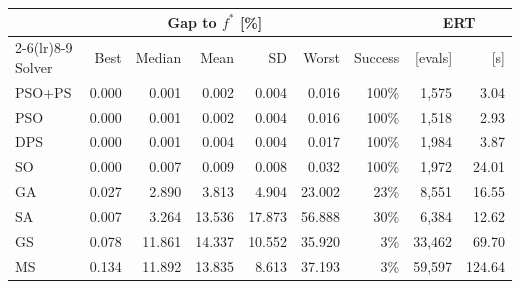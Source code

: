 \begin{tabular}{lrrrrrrrr}
\toprule
 & \multicolumn{5}{c}{Gap to $f^*$ [\%]} & & \multicolumn{2}{c}{ERT} \\
\cmidrule(lr){2-6}\cmidrule(lr){8-9}
Solver & Best & Median & Mean & SD & Worst & Success & [evals] & [s]\\
\midrule
PSO+PS & 0.000 & 0.001 & 0.002 & 0.004 & 0.016 & 100\% & 1,575 & 3.04\\
PSO & 0.000 & 0.001 & 0.002 & 0.004 & 0.016 & 100\% & 1,518 & 2.93\\
DPS & 0.000 & 0.001 & 0.004 & 0.004 & 0.017 & 100\% & 1,984 & 3.87\\
SO & 0.000 & 0.007 & 0.009 & 0.008 & 0.032 & 100\% & 1,972 & 24.01\\
GA & 0.027 & 2.890 & 3.813 & 4.904 & 23.002 & 23\% & 8,551 & 16.55\\
SA & 0.007 & 3.264 & 13.536 & 17.873 & 56.888 & 30\% & 6,384 & 12.62\\
GS & 0.078 & 11.861 & 14.337 & 10.552 & 35.920 & 3\% & 33,462 & 69.70\\
MS & 0.134 & 11.892 & 13.835 & 8.613 & 37.193 & 3\% & 59,597 & 124.64\\
\bottomrule
\end{tabular}
